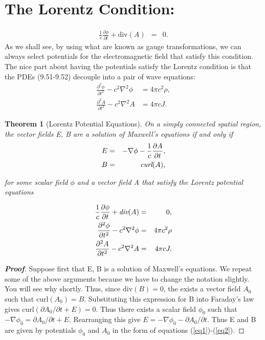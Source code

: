 \documentclass[12pt]{article}
\author{Chris Hayward}
\newtheorem{theorem}{Theorem}
\begin{document}
\section*{The Lorentz Condition:}

\begin{eqnarray}
\frac{1}{c} \frac{\partial \phi}{\partial t} + \mbox{div}(A) & = & 0.
\end{eqnarray}
As we shall see, by using what are known as gauge transformations, we can always select potentials for the electromagnetic field that satisfy this condition. The nice part about having the potentials satisfy the Lorentz condition is that the PDEs (9.51-9.52) decouple into a pair of wave equations:
\begin{align*}
\frac{\partial^2 \phi}{\partial t^2 } -c^2\nabla^2 \phi & = 4\pi c^2 \rho, \\
\frac{\partial^2 A}{\partial t^2} -c^2 \nabla^2 A & = 4\pi cJ.
\end{align*}

\begin{theorem}[Lorentz Potential Equations]
On a simply connected spatial region, the vector fields E, B are a solution of Maxwell's equations if and only if
\begin{eqnarray}
E &=& -\nabla \phi - \frac{1}{c} \frac{\partial A}{\partial t},\label{eq1} \\
B &=& \emph{curl}(A),\label{eq2}
\end{eqnarray}

for some scalar field $\phi$ and a vector field A that satisfy the Lorentz potential equations

\begin{eqnarray}
\frac{1}{c} \frac{\partial \phi}{\partial t} + \emph{div}(A) &=& 0, \\
\frac{\partial^2 \phi}{\partial t^2} - c^2 \nabla^2 \phi &=& 4\pi c^2 \rho \\
\frac{\partial^2 A}{\partial t^2} -c^2 \nabla^2 A &=& 4\pi cJ.
\end{eqnarray}

\end{theorem}
\begin{proof}[\emph{\textbf{Proof}}]
Suppose first that E, B is a solution of Maxwell's equations. We repeat some of the above arguments because we have to change the notation slightly. You will see why shortly. Thus, since $\mbox{div}(B) = 0$, the exists a vector field $A_0$ such that $\mbox{curl}(A_0) = B$. Substituting this expression for B into Faraday's law gives $\mbox{curl}(\partial A_0/\partial t + E) = 0$. Thus there exists a scalar field $\phi_0$ such that $-\nabla\phi_0 = \partial A_0/\partial t + E$. Rearranging this give $E = -\nabla\phi_0 - \partial A_0/\partial t$. Thus E and B are given by potentials $\phi_0$ and $A_0$ in the form of equations (\ref{eq1})-(\ref{eq2}).\phantom\qedhere
\end{proof}
\end{document}
